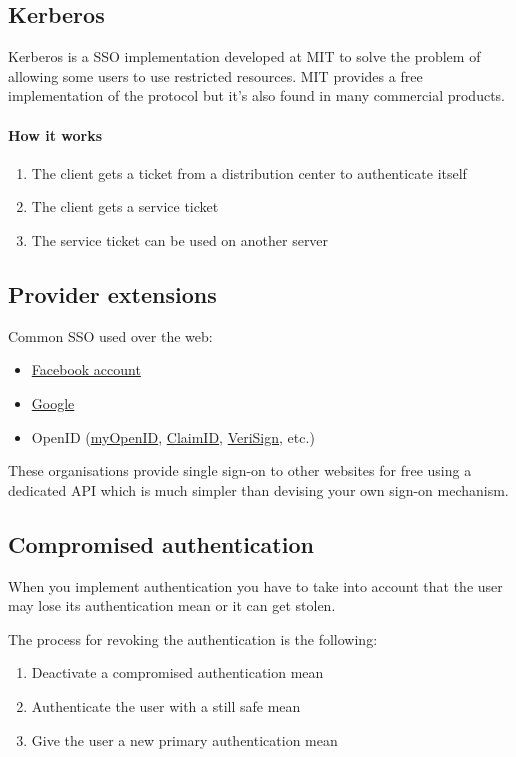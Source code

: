 \subsection{Kerberos}
Kerberos is a SSO implementation developed at MIT to solve the problem of
allowing some users to use restricted resources. MIT provides a free
implementation of the protocol but it's also found in many commercial
products.

\paragraph{How it works}
\begin{enumerate}
\item The client gets a ticket from a distribution center to authenticate itself
\item The client gets a service ticket
\item The service ticket can be used on another server
\end{enumerate}

\subsection{Provider extensions}
Common SSO used over the web:
\begin{itemize}
\item \href{http://www.facebook.com/}{Facebook account}
\item \href{http://google.com/}{Google}
\item OpenID (\href{http://myopenid.com/}{myOpenID},
\href{http://claimid.com/}{ClaimID},
\href{http://pip.verisignlabs.com/}{VeriSign}, etc.)
\end{itemize}
These organisations provide single sign-on to other websites for free
using a dedicated API which is much simpler than devising your own
sign-on mechanism.

\subsection{Compromised authentication}
When you implement authentication you have to take into account that the user
may lose its authentication mean or it can get stolen.

The process for revoking the authentication is the following:
\begin{enumerate}
\item Deactivate a compromised authentication mean
\item Authenticate the user with a still safe mean
\item Give the user a new primary authentication mean
\end{enumerate}

